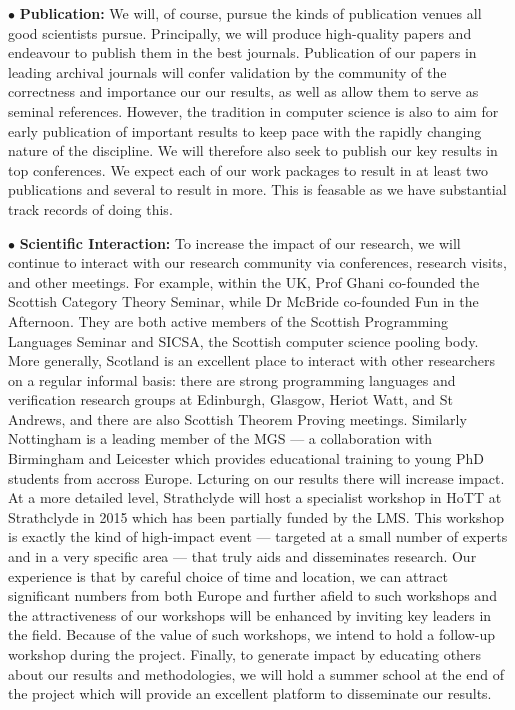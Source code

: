 \documentclass[a4paper,11pt]{article}
\begin{document}
\vspace*{0.02in}

$\bullet$ {\bf Publication:} We will, of course, pursue the kinds of
publication venues all good scientists pursue. Principally, we will
produce high-quality papers and endeavour to publish them in the best
journals. Publication of our papers in leading archival journals will
confer validation by the community of the correctness and importance
our our results, as well as allow them to serve as seminal references.
However, the tradition in computer science is also to aim for early
publication of important results to keep pace with the rapidly
changing nature of the discipline. We will therefore also seek to
publish our key results in top conferences. We expect each of our work
packages to result in at least two publications and several to result
in more. This is feasable as we have substantial track records of
doing this.

\vspace*{0.02in} $\bullet$ {\bf Scientific Interaction:} To increase
the impact of our research, we will continue to interact with our
research community via conferences, research visits, and other
meetings. For example, within the UK, Prof Ghani co-founded the
Scottish Category Theory Seminar, while Dr McBride co-founded Fun in
the Afternoon. They are both active members of the Scottish
Programming Languages Seminar and SICSA, the Scottish computer science
pooling body. More generally, Scotland is an excellent place to
interact with other researchers on a regular informal basis: there are
strong programming languages and verification research groups at
Edinburgh, Glasgow, Heriot Watt, and St Andrews, and there are also
Scottish Theorem Proving meetings. Similarly Nottingham is a leading
member of the MGS --- a collaboration with Birmingham and Leicester
which provides educational training to young PhD students from accross
Europe. Lcturing on our results there will increase impact. At a more
detailed level, Strathclyde will host a specialist workshop in HoTT at
Strathclyde in 2015 which has been partially funded by the LMS. This
workshop is exactly the kind of high-impact event --- targeted at a
small number of experts and in a very specific area --- that truly
aids and disseminates research. Our experience is that by careful
choice of time and location, we can attract significant numbers from
both Europe and further afield to such workshops and the
attractiveness of our workshops will be enhanced by inviting key
leaders in the field. Because of the value of such workshops, we
intend to hold a follow-up workshop during the project. Finally, to
generate impact by educating others about our results and
methodologies, we will hold a summer school at the end of the project
which will provide an excellent platform to disseminate our results.
\end{document}
